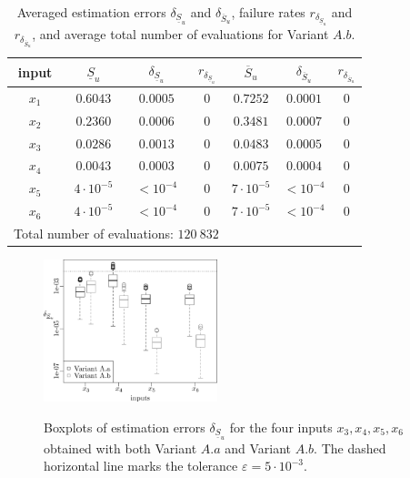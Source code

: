 \begin{table}[t]
\caption{Averaged estimation errors $\delta_{\underline{S}_u}$  and $\delta_{\overline{S}_u}$, failure rates $r_{\delta_{\underline{S}_u}}$ and $r_{\delta_{\overline{S}_u}}$, and average total number of evaluations for Variant $A.b$.}
\centering
\begin{tabular}{ccccccc}
\hline
 input & $\underline{S}_u$ & $\delta_{\underline{S}_u}$ & $r_{\delta_{\underline{S}_u}}$ & $\overline{S}_u$ & $\delta_{\overline{S}_u}$ &$r_{\delta_{\overline{S}_u}}$ \\ \hline
 $x_1$ & $0.6043$ &  $0.0005$ & $0$ & $0.7252$ & $0.0001$ & $0$ \\ \hline
 $x_2$ & $0.2360$ &  $0.0006$ & $0$ & $0.3481$ & $0.0007$ & $0$ \\ \hline
 $x_3$ & $0.0286$ &  $0.0013$ & $0$ & $0.0483$ & $0.0005$ & $0$ \\ \hline
 $x_4$ & $0.0043$ &  $0.0003$ & $0$ & $0.0075$ & $0.0004$ & $0$ \\ \hline
 $x_5$ & $4\cdot 10^{-5}$ & $< 10^{-4}$ & $0$ & $7\cdot 10^{-5}$ & $< 10^{-4}$ & $0$ \\ \hline
 $x_6$ & $4\cdot 10^{-5}$ & $< 10^{-4}$ & $0$  & $7\cdot 10^{-5}$ & $< 10^{-4}$ & $0$ \\ \hline \hline
\multicolumn{4}{l}{Total number of evaluations: $120 \ 832$} & & &\\ \hline 
\end{tabular}
\label{res.gfunc.Ab}
\end{table}
\begin{figure}[t]
\caption{Boxplots of estimation errors $\delta_{\underline{S}_u}$ for the four inputs $x_3,x_4,x_5,x_6$ obtained with both Variant $A.a$ and Variant $A.b$. The dashed horizontal line marks the tolerance $\varepsilon=5\cdot 10^{-3}$.}
\vspace*{0.2cm}
\centering
\includegraphics[width=0.45\textwidth]{sobolg_box.eps}
\label{boxplots.gfunc}
\end{figure}

